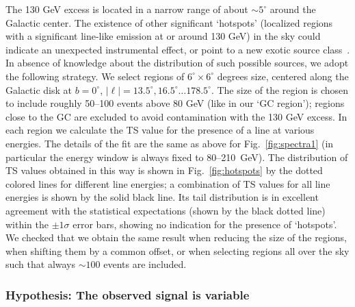 \documentclass[aps,twocolumn,prd,superscriptaddress,showpacs,nofootinbib,fixfloat]{revtex4}
\begin{document}
The 130 GeV excess is located in a narrow range of about $\sim5^\circ$ around
the Galactic center. The existence of other significant `hotspots' (localized
regions with a significant line-like emission at or around 130 GeV) in the sky
could indicate an unexpected instrumental effect, or point to a new exotic
source class~\cite{Boyarsky:2012ca}. 
In absence of knowledge about the distribution of such possible
sources, we adopt the following strategy. We select regions of
$6^\circ\times6^\circ$ degrees size, centered along the Galactic disk at
$b=0^\circ$, $|\ell|=13.5^\circ, 16.5^\circ \dots 178.5^\circ$. The size of
the region is chosen to include roughly 50--100 events above 80 GeV (like in our `GC
region'); regions close to the GC are excluded to avoid contamination with the
130 GeV excess. In each region we calculate the TS value for the presence of
a line at various energies. The details of the fit are the same as above for
Fig.~\ref{fig:spectra1} (in particular the energy window is always fixed to
80--210~GeV). The distribution of TS values obtained in this way is
shown in Fig.~\ref{fig:hotspots} by the dotted colored lines for different
line energies; a combination of
TS values for all line energies is shown by the solid black line. Its tail
distribution is in excellent agreement with the statistical expectations
(shown by the black dotted line) within the $\pm1\sigma$ error bars, showing
no indication for the presence of `hotspots'. We
checked that we obtain the same result when reducing the size of the regions,
when shifting them by a common offset, or when selecting regions all over the
sky such that always $\sim100$ events are included. 

\subsubsection{Hypothesis: The observed signal is variable}
\end{document}
